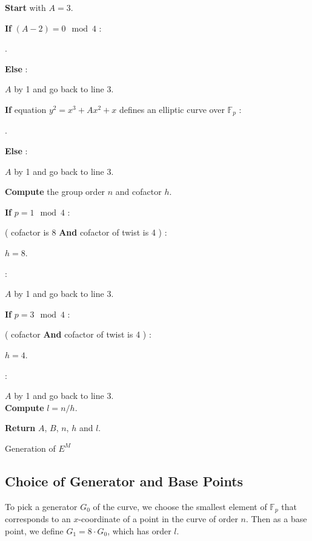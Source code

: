 \documentclass{article}
\newcommand{\Fp}{\ensuremath{\mathbb{F}_p}}
\theoremstyle{definition}
\theoremstyle{remark}
\begin{document}
\begin{spacing}{1.2}
\begin{multicols}{2}
\begin{algorithm}[H]
	{\bf Start} with $A = 3$.
	
	{\bf If} $(A-2) = 0 \mod4$ : 
	
		.
		
	{\bf Else} : 
	
		 $A$ by 1 and go back to line 3.
	
	{\bf If} equation $y^2 = x^3 + A x^2 + x$ defines an elliptic curve over $\Fp$ : 
	
		.
	
	{\bf Else} : 
	
		 $A$ by 1 and go back to line 3.
	
	{\bf Compute} the group order $n$ and cofactor $h$.
			
	{\bf If} $p = 1\mod 4$ : 
	
		 ( cofactor is 8 {\bf And} cofactor of twist is 4 ) :
			 	
			\qquad {} $h = 8$.
		
		 :

			\qquad {} $A$ by 1 and go back to line 3.

	{\bf If} $p = 3\mod 4$ : 
			
		 ( cofactor {\bf And} cofactor of twist is 4 ) :

			\qquad {} $h = 4$.
		
		 :

			\qquad {} $A$ by 1 and go back to line 3.\\

	{\bf Compute} $l = n / h$.
	
	{\bf Return} $A$, $B$, $n$, $h$ and $l$.		

\caption{Generation of $E^M$}
\end{algorithm}

\subsection{Choice of Generator and Base Points}
	
To pick a generator $G_0$ of the curve, we choose the smallest element of $\Fp$ that corresponds to an $x$-coordinate of a point in the curve of order $n$. Then as a base point, we define $G_1 = 8\cdot G_0$, which has order $l$. 

\vspace{0.2cm}
\begin{algorithm}[H] %
	\SetAlgoLined
	

\end{algorithm}
\end{multicols}
\end{spacing}
\end{document}
